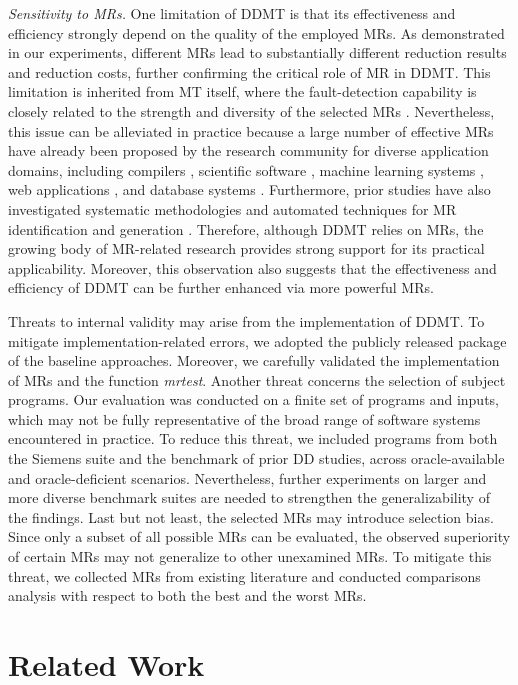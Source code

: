 \emph{Sensitivity to MRs.}
One limitation of DDMT is that its effectiveness and efficiency strongly depend on the quality of the employed MRs. 
As demonstrated in our experiments, different MRs lead to substantially different reduction results and reduction costs, further confirming the critical role of MR in DDMT. 
This limitation is inherited from MT itself, where the fault-detection capability is closely related to the strength and diversity of the selected MRs \cite{Liu2013}. 
Nevertheless, this issue can be alleviated in practice because a large number of effective MRs have already been proposed by the research community for diverse application domains, including compilers \cite{Le2014, xiao2022}, scientific software \cite{peng2021}, machine learning systems \cite{dwarakanath2018}, web applications \cite{chaleshtari2023}, and database systems \cite{lin2025}. 
Furthermore, prior studies have also investigated systematic methodologies and automated techniques for MR identification and generation \cite{li2025}. 
Therefore, although DDMT relies on MRs, the growing body of MR-related research provides strong support for its practical applicability.
Moreover, this observation also suggests that the effectiveness and efficiency of DDMT can be further enhanced via more powerful MRs.

Threats to internal validity may arise from the implementation of DDMT. 
To mitigate implementation-related errors, we adopted the publicly released package of the baseline approaches.
Moreover, we
carefully validated the implementation of MRs and the function \emph{mrtest}.
Another threat concerns the selection of subject programs. Our evaluation was conducted on a finite set of programs and inputs, which may not be fully representative of the broad range of software systems encountered in practice.
To reduce this threat, we included programs from both the Siemens suite and the benchmark of prior DD studies, across oracle-available and oracle-deficient scenarios.
Nevertheless, further experiments on larger and more diverse benchmark suites are needed to strengthen the generalizability of the findings.
Last but not least, the selected MRs may introduce selection bias. Since only a subset of all possible MRs can be evaluated, the observed superiority of certain MRs may not generalize to other unexamined MRs. 
To mitigate this threat, we collected MRs from existing literature and conducted comparisons analysis with respect to both the best and the worst MRs.


\section{Related Work}
\label{sec:rw}

